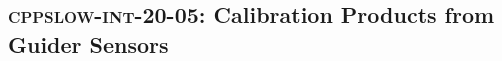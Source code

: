 \subsection{\textsc{cppslow-int-20-05}: Calibration Products from Guider Sensors}
\label{cppslow-int-20-05}
